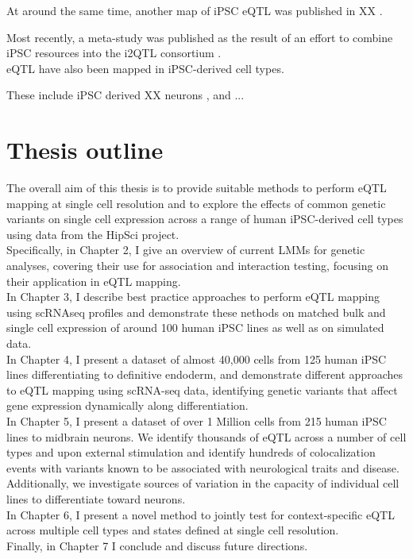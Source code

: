 At around the same time, another map of iPSC eQTL was published in XX \cite{deboever2017large}.

Most recently, a meta-study was published as the result of an effort to combine iPSC resources into the i2QTL consortium  
\cite{bonder2019systematic}.\\

eQTL have also been mapped in iPSC-derived cell types.

These include iPSC derived XX neurons \cite{schwartzentruber2018molecular}, and ...

\newpage

\section{Thesis outline}

The overall aim of this thesis is to provide suitable methods to perform eQTL mapping at single cell resolution and to explore the effects of common genetic variants on single cell expression across a range of human iPSC-derived cell types using data from the HipSci project.\\

Specifically, in Chapter 2, I give an overview of current LMMs for genetic analyses, covering their use for association and interaction testing, focusing on their application in eQTL mapping.\\

In Chapter 3, I describe best practice approaches to perform eQTL mapping using scRNAseq profiles and demonstrate these nethods on matched bulk and single cell expression of around 100 human iPSC lines as well as on simulated data.  \\

In Chapter 4, I present a dataset of almost 40,000 cells from 125 human iPSC lines differentiating to definitive endoderm, and demonstrate different approaches to eQTL mapping using scRNA-seq data, identifying genetic variants that affect gene expression dynamically along differentiation. \\

In Chapter 5, I present a dataset of over 1 Million cells from 215 human iPSC lines to midbrain neurons.
We identify thousands of eQTL across a number of cell types and upon external stimulation and identify hundreds of colocalization events with variants known to be associated with neurological traits and disease.
Additionally, we investigate sources of variation in the capacity of individual cell lines to differentiate toward neurons.\\

In Chapter 6, I present a novel method to jointly test for context-specific eQTL across multiple cell types and states defined at single cell resolution. \\

Finally, in Chapter 7 I conclude and discuss future directions.